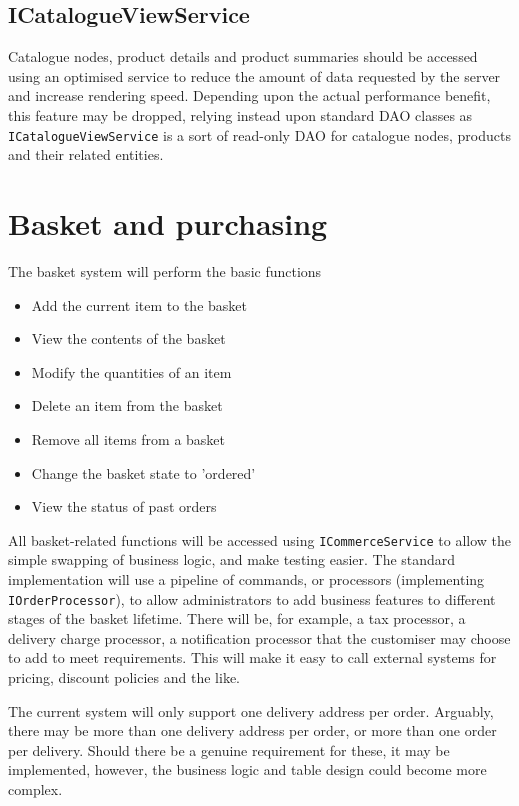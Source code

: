 \documentclass[12pt]{article}
\begin{document}
\subsection{ICatalogueViewService}
Catalogue nodes, product details and product summaries should be accessed using an optimised service to reduce the amount of data requested by the server and increase rendering speed. Depending upon the actual performance benefit, this feature may be dropped, relying instead upon standard \textsc{DAO} classes as \texttt{ICatalogueViewService} is a sort of read-only \textsc{DAO} for catalogue nodes, products and their related entities.

\section{Basket and purchasing}
The basket system will perform the basic functions
\begin{itemize}
	\item Add the current item to the basket
	\item View the contents of the basket
	\item Modify the quantities of an item
	\item Delete an item from the basket
	\item Remove all items from a basket
	\item Change the basket state to 'ordered'
	\item View the status of past orders
\end{itemize}

All basket-related functions will be accessed using \texttt{ICommerceService} to allow the simple swapping of business logic, and make testing easier. The standard implementation will use a pipeline of commands, or processors (implementing \texttt{IOrderProcessor}), to allow administrators to add business features to different stages of the basket lifetime. There will be, for example, a tax processor, a delivery charge processor, a notification processor that the customiser may choose to add to meet requirements. This will make it easy to call external systems for pricing, discount policies and the like.

The current system will only support one delivery address per order. Arguably, there may be more than one delivery address per order, or more than one order per delivery. Should there be a genuine requirement for these, it may be implemented, however, the business logic and table design could become more complex.
\end{document}
